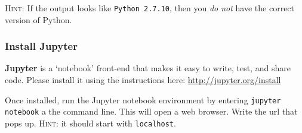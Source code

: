 \documentclass[12pt]{article}
\numberwithin{equation}{section}    %
\begin{document}
\noindent\textsc{Hint}: If the output looks like \texttt{Python  2.7.10}, then you \emph{do not} have the correct version of Python.
\vspace{2em}

\subsubsection{Install Jupyter}

\textbf{Jupyter} is a `notebook' front-end that makes it easy to write, test, and share code. Please install it using the instructions here: \url{http://jupyter.org/install}

Once installed, run the Jupyter notebook environment by entering \texttt{jupyter notebook} a the command line. This will open a web browser. Write the url that pops up. \textsc{Hint}: it should start with \texttt{localhost}.
\end{document}
